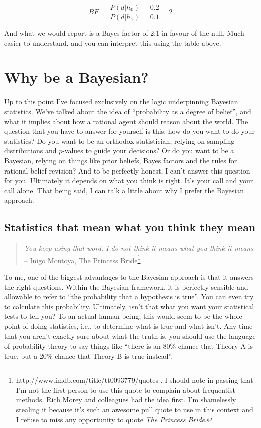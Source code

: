 \documentclass[
  a4paper,
]{book}
\begin{document}
\[BF^{'}=\frac{P(d|h_0)}{P(d|h_1)}=\frac{0.2}{0.1}=2\]

And what we would report is a Bayes factor of 2:1 in favour of the null.
Much easier to understand, and you can interpret this using the table
above.

\hypertarget{why-be-a-bayesian}{%
\section{Why be a Bayesian?}\label{why-be-a-bayesian}}

Up to this point I've focused exclusively on the logic underpinning
Bayesian statistics. We've talked about the idea of ``probability as a
degree of belief'', and what it implies about how a rational agent
should reason about the world. The question that you have to answer for
yourself is this: how do you want to do your statistics? Do you want to
be an orthodox statistician, relying on sampling distributions and
\(p\)-values to guide your decisions? Or do you want to be a Bayesian,
relying on things like prior beliefs, Bayes factors and the rules for
rational belief revision? And to be perfectly honest, I can't answer
this question for you. Ultimately it depends on what you think is right.
It's your call and your call alone. That being said, I can talk a little
about why I prefer the Bayesian approach.

\hypertarget{statistics-that-mean-what-you-think-they-mean}{%
\subsection{Statistics that mean what you think they
mean}\label{statistics-that-mean-what-you-think-they-mean}}

\begin{quote}
\emph{You keep using that word. I do not think it means what you think
it means}\\
-- Inigo Montoya, The Princess Bride\footnote{http://www.imdb.com/title/tt0093779/quotes
  . I should note in passing that I'm not the first person to use this
  quote to complain about frequentist methods. Rich Morey and colleagues
  had the idea first. I'm shamelessly stealing it because it's such an
  awesome pull quote to use in this context and I refuse to miss any
  opportunity to quote \emph{The Princess Bride}.}
\end{quote}

To me, one of the biggest advantages to the Bayesian approach is that it
answers the right questions. Within the Bayesian framework, it is
perfectly sensible and allowable to refer to ``the probability that a
hypothesis is true''. You can even try to calculate this probability.
Ultimately, isn't that what you want your statistical tests to tell you?
To an actual human being, this would seem to be the whole point of doing
statistics, i.e., to determine what is true and what isn't. Any time
that you aren't exactly sure about what the truth is, you should use the
language of probability theory to say things like ``there is an 80\%
chance that Theory A is true, but a 20\% chance that Theory B is true
instead''.
\end{document}
